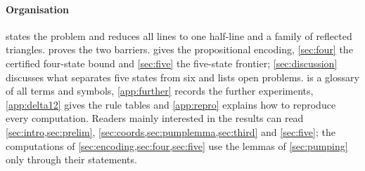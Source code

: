 \paragraph{Organisation}
 states the problem and reduces all lines to one
half-line and a family of reflected triangles.  proves
the two barriers.  gives the propositional encoding,
\cref{sec:four} the certified four-state bound and \cref{sec:five} the
five-state frontier; \cref{sec:discussion} discusses what separates five
states from six and lists open problems.  is a glossary
of all terms and symbols, \cref{app:further} records the further
experiments, \cref{app:delta12} gives the rule tables and \cref{app:repro}
explains how to reproduce every computation. Readers mainly interested in
the results can read \cref{sec:intro,sec:prelim},
\cref{sec:coords,sec:pumplemma,sec:third} and \cref{sec:five}; the
computations of \cref{sec:encoding,sec:four,sec:five} use the lemmas of
\cref{sec:pumping} only through their statements.
